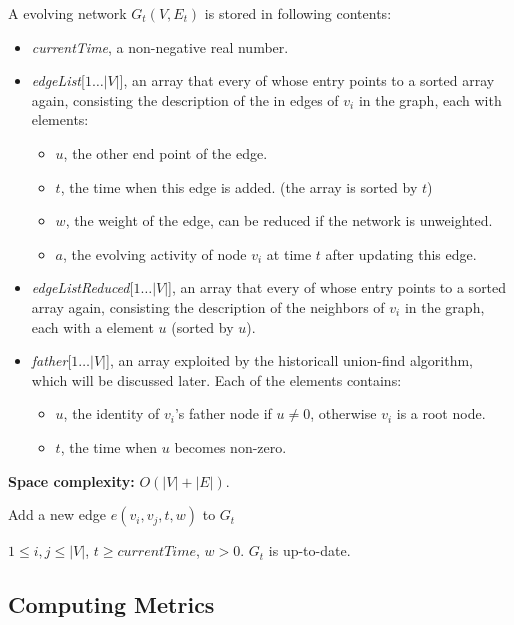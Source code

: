 \documentclass[12pt,abstract=true]{scrartcl}
\numberwithin{equation}{section}
\theoremstyle{definition}   \newtheorem{definition}{Definition}[section]
\theoremstyle{plain}        \newtheorem{theorem}{Theorem}[section]
\theoremstyle{plain}        \newtheorem{observation}{Observation}[section]
\theoremstyle{plain}        \newtheorem{fact}{Fact}[section]
\theoremstyle{plain}        \newtheorem{claim}{Claim}[section]
\theoremstyle{plain}        \newtheorem{lemma}[theorem]{Lemma}
\theoremstyle{plain}        \newtheorem{corollary}[theorem]{Corollary}
\theoremstyle{remark}       \newtheorem{example}{Example}[section]
\theoremstyle{remark}       \newtheorem{remark}{Remark}[section]
\begin{document}
A evolving network $G_t(V,E_t)$ is stored in following contents:
\begin{itemize}
\item \textit{currentTime}, a non-negative real number.
\item \textit{edgeList}[$1\dots|V|$], an array that every of
whose entry points to a sorted array again, consisting the description of the
in edges of $v_i$ in the graph, each with elements:
\begin{itemize}
\item $u$, the other end point of the edge.
\item $t$, the time when this edge is added. (the array is sorted by $t$)
\item $w$, the weight of the edge, can be reduced if the network is unweighted.
\item $a$, the evolving activity of node $v_i$ at time $t$ after updating this
edge.
\end{itemize}

\item \textit{edgeListReduced}[$1\dots|V|$], an array that every of
whose entry points to a sorted array again, consisting the description of the
neighbors of $v_i$ in the graph, each with a element $u$ (sorted by $u$).

\item \textit{father}[$1\dots|V|$], an array exploited by the historicall
union-find algorithm, which will be discussed later. Each of the elements
contains:
\begin{itemize}
\item $u$, the identity of $v_i$'s father node if $u\neq 0$, otherwise $v_i$
is a root node.
\item $t$, the time when $u$ becomes non-zero.
\end{itemize}

\end{itemize}
\textbf{Space complexity:} $O(|V|+|E|)$.

\begin{algorithm}
\caption{Add a new edge $e(v_i,v_j,t,w)$ to $G_t$}
\begin{algorithmic}[1]
\Require $1\leq i,j\leq |V|$, $t\geq currentTime$, $w>0$.
\Ensure $G_t$ is up-to-date.
\State 
\end{algorithmic}
\end{algorithm}
\subsection{Computing Metrics}
\end{document}
